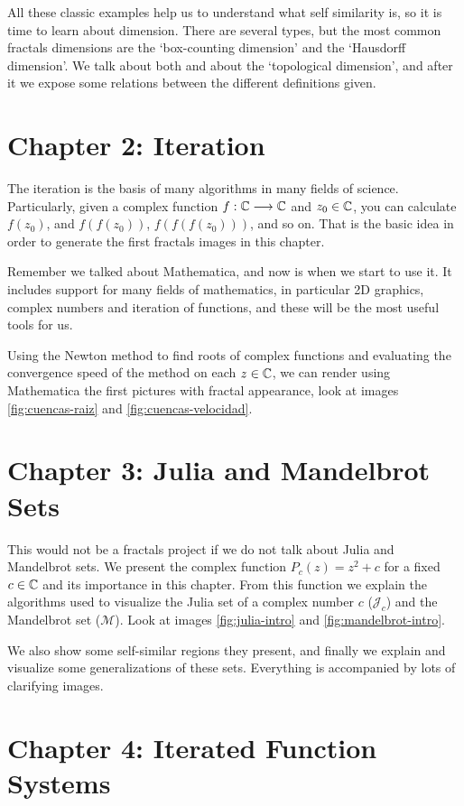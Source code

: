 All these classic examples help us to understand what self similarity is, so it is time to learn about dimension. There are several types, but the most common fractals dimensions are the `box-counting dimension' and the `Hausdorff dimension'. We talk about both and about the `topological dimension', and after it we expose some relations between the different definitions given.

\section*{Chapter 2: Iteration}

The iteration is the basis of many algorithms in many fields of science. Particularly, given a complex function $f:\mathbb{C}\longrightarrow\mathbb{C}$ and $z_0\in\mathbb{C}$, you can calculate $f(z_0)$, and $f(f(z_0))$, $f(f(f(z_0)))$, and so on. That is the basic idea in order to generate the first fractals images in this chapter.

Remember we talked about Mathematica, and now is when we start to use it. It includes support for many fields of mathematics, in particular 2D graphics, complex numbers and iteration of functions, and these will be the most useful tools for us. 

Using the Newton method to find roots of complex functions and evaluating the convergence speed of the method on each $z\in\mathbb{C}$, we can render using Mathematica the first pictures with fractal appearance, look at images \ref{fig:cuencas-raiz} and \ref{fig:cuencas-velocidad}.

\section*{Chapter 3: Julia and Mandelbrot Sets}

This would not be a fractals project if we do not talk about Julia and Mandelbrot sets. We present the complex function $P_c(z)=z^2 +c$ for a fixed $c\in\mathbb{C}$ and its importance in this chapter. From this function we explain the algorithms used to visualize the Julia set of a complex number $c$ ($\mathcal{J}_c$) and the Mandelbrot set ($\mathcal{M}$). Look at images \ref{fig:julia-intro} and \ref{fig:mandelbrot-intro}. 

We also show some self-similar regions they present, and finally we explain and visualize some generalizations of these sets. Everything is accompanied by lots of clarifying images.

\section*{Chapter 4: Iterated Function Systems}

